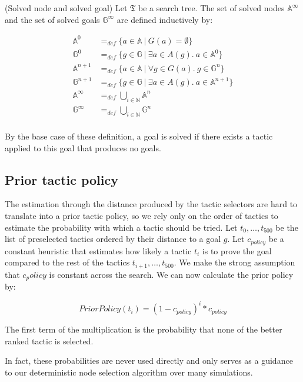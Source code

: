 \documentclass[runningheads,a4paper,draft]{svjour3}
\begin{document}
\begin{definition}(Solved node and solved goal)
Let $\mathfrak{T}$ be a search tree. The set of solved nodes 
$\mathbb{A}^\infty$ and 
the set of solved goals $\mathbb{G}^\infty$ are defined inductively by:

\begin{align*}
\mathbb{A}^{0} &=_{def} 
\lbrace a \in \mathbb{A}\ |\ G(a) = \emptyset \rbrace \\ 
\mathbb{G}^{0} &=_{def} \lbrace g \in \mathbb{G}\ |\ 
\exists a \in A(g).\ a \in \mathbb{A}^{0} \rbrace\\
\mathbb{A}^{n+1} &=_{def} \lbrace a \in \mathbb{A}\ |\ 
\forall g \in G(a).\ g \in \mathbb{G}^{n} \rbrace\\
\mathbb{G}^{n+1} &=_{def} \lbrace g \in \mathbb{G}\ |\ 
\exists a \in A(g).\ a \in \mathbb{A}^{n+1} \rbrace \\
\mathbb{A}^\infty &=_{def} \bigcup_{i \in \mathbb{N}} \mathbb{A}^n\\
\mathbb{G}^\infty &=_{def} \bigcup_{i \in \mathbb{N}} \mathbb{G}^n\\
\end{align*}

By the base case of these definition, a goal is solved if there exists a tactic 
applied to this goal that produces no goals.
\end{definition}

\subsection{Prior tactic policy}
The estimation through the distance produced by the tactic selectors are hard 
to translate into a prior tactic policy, so we rely only on the order of 
tactics to estimate the probability with which a tactic should be tried.
Let $t_0,\ldots,t_500$ be the list of preselected tactics ordered by their 
distance to a goal $g$. Let $c_{policy}$ be a constant heuristic that estimates 
how likely a tactic $t_i$ is to prove the goal compared to the rest of the 
tactics $t_{i+1},\ldots,t_{500}$. We make the strong assumption that $c_policy$ 
is constant across the search. We can now calculate the prior policy by:
   
\[PriorPolicy(t_{i}) = (1 - c_{policy})^{i} * c_{policy}\]

The first term of the multiplication is the probability that none of the better 
ranked tactic is selected. 

In fact, these probabilities are never used directly and only serves as a 
guidance to our deterministic node selection algorithm over many simulations.
\end{document}
